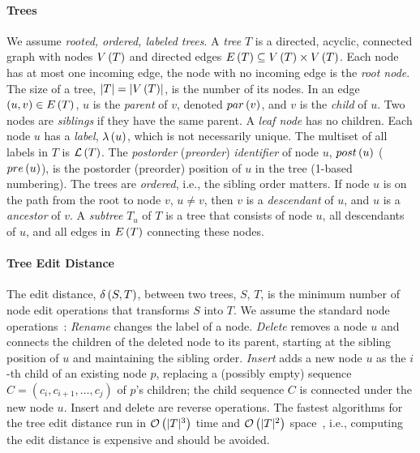 
\paragraph{Trees}

We assume \emph{rooted, ordered, labeled trees}. A \emph{tree} $T$ is a directed, acyclic, connected graph with nodes $V \left( T \right)$ and directed edges $E \left( T \right) \subseteq V \left( T \right) \times V \left( T \right)$. Each node has at most one incoming edge, the node with no incoming edge is the \emph{root node}. The size of a tree, $\left| T \right|=\left| V \left( T \right) \right|$, is the number of its nodes.
%
In an edge $\left( u, v \right) \in E \left( T \right)$, $u$ is the \emph{parent} of $v$, denoted $par \left( v \right)$, and $v$ is the \emph{child} of $u$. Two nodes are \emph{siblings} if they have the same parent. A \emph{leaf node} has no children. Each node $u$ has a \emph{label}, $\lambda \left( u \right)$, which is not necessarily unique. The multiset of all labels in $T$ is $\mathcal{L} \left( T \right)$.
%
The \emph{postorder} (\emph{preorder}) \emph{identifier} of node $u$, $post \left( u \right)$ ($pre \left( u \right)$), is the postorder (preorder) position of $u$ in the tree (1-based numbering).  The trees are \emph{ordered}, i.e., the sibling order matters. If node $u$ is on the path from the root to node $v$, $u\neq v$, then $v$ is a \emph{descendant} of $u$, and $u$ is a \emph{ancestor} of $v$.
%
A \emph{subtree} $T_u$ of $T$ is a tree that consists of node $u$, all descendants of $u$, and all edges in $E \left( T \right)$ connecting these nodes.

\paragraph{Tree Edit Distance}

The edit distance, $\delta \left( S, T \right)$, between two trees, $S$, $T$, is the minimum number of node edit operations that transforms $S$ into $T$. We assume the standard node operations~\cite{zhang-siam-1989}: \emph{Rename} changes the label of a node. \emph{Delete} removes a node $u$ and connects the children of the deleted node to its parent, starting at the sibling position of $u$ and maintaining the  sibling order.
%
\emph{Insert} adds a new node $u$ as the $i$-th child of an existing node $p$, replacing a (possibly empty) sequence $C=(c_i, c_{i+1}, \ldots, c_j)$ of $p$'s children; the child sequence $C$ is connected under the new node $u$. Insert and delete are reverse operations. The fastest algorithms for the tree edit distance run in $\mathcal{O} \left( |T|^3 \right)$ time and $\mathcal{O} \left( |T|^2 \right)$ space~\cite{pawlik-infsys-2016}, i.e., computing the edit distance is expensive and should be avoided.

